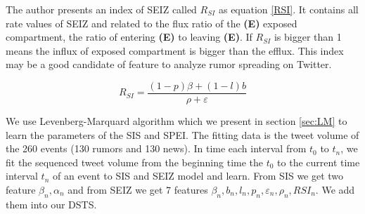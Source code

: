 \begin{table}[!h]
 \centering
{}
\caption{Parameters of SEIZ}
\label{tab:SEIZ_Para}
\end{table}
\newpage
The author presents an index of SEIZ called $R_{SI}$ as equation \ref{RSI}. It contains all rate values of SEIZ and related to the flux ratio of the \textbf{(E)} exposed compartment, the ratio of entering \textbf{(E)} to leaving \textbf{(E)}. If $R_{SI}$ is bigger than 1 means the influx of exposed compartment is bigger than the efflux. This index may be a good candidate of feature to analyze rumor spreading on Twitter.


\begin{equation}
\label{RSI}
R_{SI}=\frac{(1-p)\beta+(1-l)b}{\rho+\varepsilon}  
\end{equation}

We use Levenberg-Marquard algorithm which we present in section \ref{sec:LM} to learn the parameters of the SIS and SPEI. The fitting data is the tweet volume of the 260 events  (130 rumors and 130 news). 
 In time each interval from $t_0$ to $t_n$, we fit the sequenced  tweet volume from the beginning time the $t_0$ to the current time interval $t_n$ of an event to SIS and SEIZ model and learn. From SIS we get two feature $\beta_{n},\alpha_{n}$ and from SEIZ we get 7 features $\beta_{n},b_{n},l_{n},p_{n},\varepsilon_{n},\rho_{n},RSI_{n}$. We add them into our DSTS.
 
